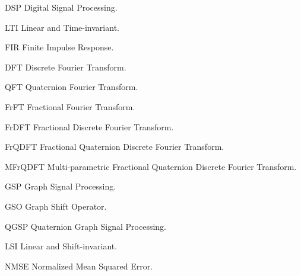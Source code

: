 \documentclass[
	11pt,				%
	openright,			%
	twoside,			%
	a4paper,			%
	french,				%
	brazil,			%
	english				%
	]{abntex2}
\newcommand{\listofquadrosname}{Lista de quadros}
\begin{document}
%

%

\listoffigures*
\cleardoublepage



\begin{siglas}
    \item[DSP] Digital Signal Processing.
    \item[LTI] Linear and Time-invariant.
    \item[FIR] Finite Impulse Response.
    \item[DFT] Discrete Fourier Transform.
    \item[QFT] Quaternion Fourier Transform.
    \item[FrFT] Fractional Fourier Transform.
    \item[FrDFT] Fractional Discrete Fourier Transform.
    \item[FrQDFT] Fractional Quaternion Discrete Fourier Transform.
    \item[MFrQDFT] Multi-parametric Fractional Quaternion Discrete Fourier Transform.
    \item[GSP] Graph Signal Processing.
    \item[GSO] Graph Shift Operator.
    \item[QGSP] Quaternion Graph Signal Processing.
    \item[LSI] Linear and Shift-invariant.
    \item[NMSE] Normalized Mean Squared Error.
\end{siglas}
\end{document}
